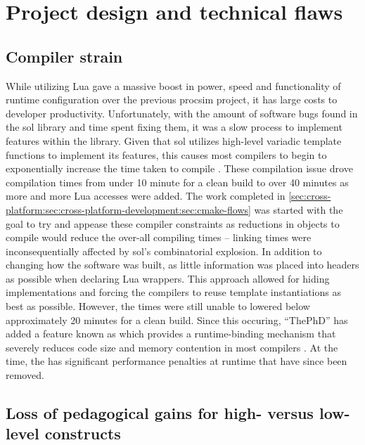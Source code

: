 \section{Project design and technical flaws}

\subsection{Compiler strain}

While utilizing Lua gave a massive boost in power, speed and functionality of runtime configuration over the previous procsim project, it has large costs to developer productivity. Unfortunately, with the amount of software bugs found in the sol library and time spent fixing them, it was a slow process to implement features within the library. Given that sol utilizes high-level variadic template functions to implement its features, this causes most compilers to begin to exponentially increase the time taken to compile \cite{Github:ThePhD:sol2:issue:126, Github:ThePhD:sol2:issue:295, Github:ThePhD:sol2:compilation}. These compilation issue drove compilation times from under 10 minute for a clean build to over 40 minutes as more and more Lua accesses were added. The work completed in \cref{sec:cross-platform:sec:cross-platform-development:sec:cmake-flows} was started with the goal to try and appease these compiler constraints as reductions in objects to compile would reduce the over-all compiling times -- linking times were inconsequentially affected by sol's combinatorial explosion. In addition to changing how the software was built, as little information was placed into headers as possible when declaring Lua wrappers. This approach allowed for hiding implementations and forcing the compilers to reuse template instantiations as best as possible. However, the times were still unable to lowered below approximately 20 minutes for a clean build. Since this occuring, ``ThePhD'' has added a feature known as  which provides a runtime-binding mechanism that severely reduces code size and memory contention in most compilers \cite{Github:ThePhD:sol2:simple-usertype}. At the time, the  has significant performance penalties at runtime that have since been removed. 

\subsection{Loss of pedagogical gains for high- versus low-level constructs}

